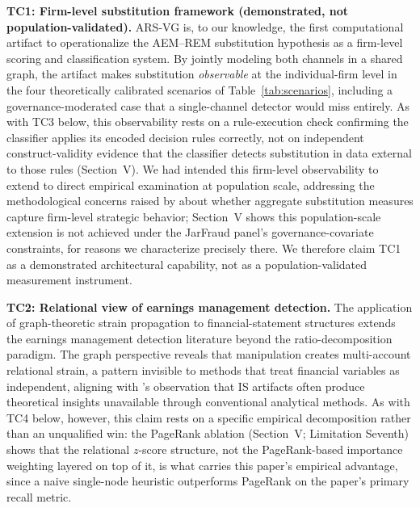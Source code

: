 \documentclass[12pt]{article}
\begin{document}
\textbf{TC1: Firm-level substitution framework (demonstrated, not
population-validated).}  ARS-VG is, to our
knowledge, the first computational artifact to operationalize the AEM--REM
substitution hypothesis as a firm-level scoring and classification system.
By jointly modeling both channels in a shared graph, the artifact makes
substitution \emph{observable} at the individual-firm level in the four
theoretically calibrated scenarios of Table~\ref{tab:scenarios}, including
a governance-moderated case that a single-channel detector would miss
entirely.  As with TC3 below, this observability rests on a
rule-execution check confirming the classifier applies its encoded
decision rules correctly, not on independent construct-validity evidence
that the classifier detects substitution in data external to those
rules (Section~V).  We had intended this firm-level observability to extend to
direct empirical examination at population scale, addressing the
methodological concerns raised by \citet{cohenlys2022} about whether
aggregate substitution measures capture firm-level strategic behavior;
Section~V shows this population-scale extension is not achieved
under the JarFraud panel's governance-covariate constraints, for reasons
we characterize precisely there.  We therefore claim TC1 as a
demonstrated architectural capability, not as a population-validated
measurement instrument.

\textbf{TC2: Relational view of earnings management detection.}  The
application of graph-theoretic strain propagation to financial-statement
structures extends the earnings management detection literature beyond the
ratio-decomposition paradigm.  The graph perspective reveals that
manipulation creates multi-account relational strain, a pattern invisible
to methods that treat financial variables as independent, aligning with
\citet{march1995}'s observation that IS artifacts often produce theoretical
insights unavailable through conventional analytical methods.  As with
TC4 below, however, this claim rests on a specific empirical
decomposition rather than an unqualified win: the PageRank ablation
(Section~V; Limitation Seventh) shows that the relational
$z$-score structure, not the PageRank-based importance weighting layered
on top of it, is what carries this paper's empirical advantage, since a
naive single-node heuristic outperforms PageRank on the paper's primary
recall metric.
\end{document}
